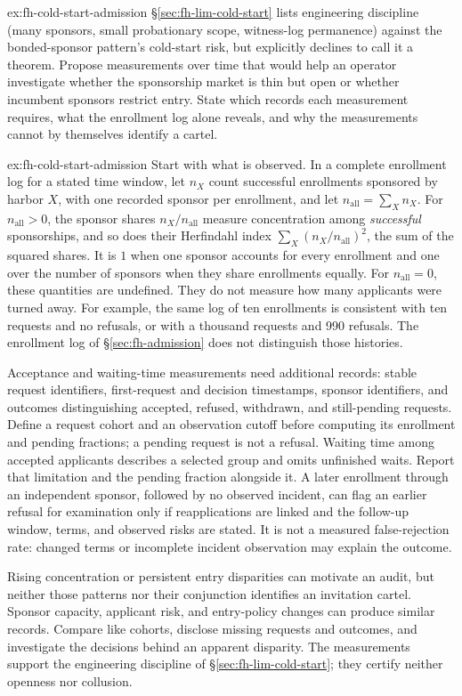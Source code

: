 \documentclass[11pt,a4paper]{article}
\theoremstyle{definition}
\theoremstyle{remark}
\begin{document}
\begin{pdexercise}[kind=Open,rating=3]{ex:fh-cold-start-admission}
\S\ref{sec:fh-lim-cold-start} lists engineering discipline (many sponsors, small probationary scope, witness-log permanence) against the bonded-sponsor pattern's cold-start risk, but explicitly declines to call it a theorem. Propose measurements over time that would help an operator investigate whether the sponsorship market is thin but open or whether incumbent sponsors restrict entry. State which records each measurement requires, what the enrollment log alone reveals, and why the measurements cannot by themselves identify a cartel.
\end{pdexercise}
\begin{pdsolution}{ex:fh-cold-start-admission}
Start with what is observed. In a complete enrollment log for a stated time
window, let $n_X$ count successful enrollments sponsored by harbor $X$, with one
recorded sponsor per enrollment, and let $n_{\mathrm{all}}=\sum_X n_X$. For $n_{\mathrm{all}}>0$, the
sponsor shares $n_X/n_{\mathrm{all}}$ measure concentration among
\emph{successful} sponsorships, and so does their Herfindahl index
$\sum_X(n_X/n_{\mathrm{all}})^2$, the sum of the squared shares. It is $1$ when
one sponsor accounts for every enrollment and one over the number of sponsors
when they share enrollments equally. For $n_{\mathrm{all}}=0$, these quantities
are undefined. They do not measure how many applicants were turned away.
For example, the same log of ten enrollments is consistent with ten requests
and no refusals, or with a thousand requests and 990 refusals. The enrollment
log of \S\ref{sec:fh-admission} does not distinguish those histories.

Acceptance and waiting-time measurements need additional records: stable
request identifiers, first-request and decision timestamps, sponsor identifiers,
and outcomes distinguishing accepted, refused, withdrawn, and still-pending
requests. Define a request cohort and an observation cutoff before computing
its enrollment and pending fractions; a pending request is not a refusal.
Waiting time among accepted applicants describes a selected group and omits
unfinished waits. Report that limitation and the pending fraction alongside it.
A later enrollment through an independent sponsor, followed by no observed incident,
can flag an earlier refusal for examination only if reapplications are linked
and the follow-up window, terms, and observed risks are stated. It is not a
measured false-rejection rate: changed terms or incomplete incident observation
may explain the outcome.

Rising concentration or persistent entry disparities can motivate an audit,
but neither those patterns nor their conjunction identifies an invitation
cartel. Sponsor capacity, applicant risk, and entry-policy changes can
produce similar records. Compare like cohorts, disclose missing requests and
outcomes, and investigate the decisions behind an apparent disparity. The
measurements support the engineering discipline of
\S\ref{sec:fh-lim-cold-start}; they certify neither openness nor collusion.
\end{pdsolution}
\end{document}
